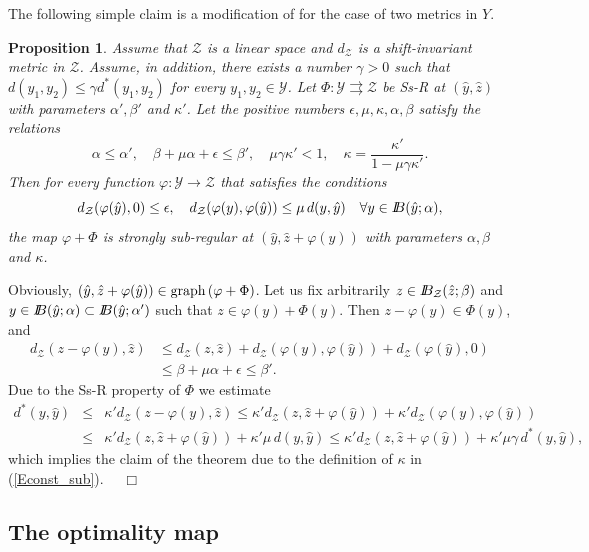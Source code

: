 \documentclass[11pt]{article}
\newtheorem{prop}[theo]{Proposition}
\newcommand{\bd}{\begin{displaymath}}
\newcommand{\ed}{\end{displaymath}}
\newcommand{\be}{\begin{equation}}
\newcommand{\ee}{\end{equation}}
\newcommand{\bda}{\begin{eqnarray*}}
\newcommand{\eda}{\end{eqnarray*}}
\newcommand{\B}{I\kern -.35em B}
\newcommand{\gr}{\mbox{\rm graph\,}}
\renewenvironment{proof}[1]{%
\par\vspace{1\baselineskip}%
\noindent{\em Proof#1.\ \ }\ignorespaces }{%
\nobreak\hfill\mbox{\ \ $\Box$}%
\par\vspace{1\baselineskip}%
}
\newcommand{\st}{\subset}
\newcommand{\al}{\alpha}
\newcommand{\ph}{\varphi}
\newcommand{\Y}{\mathcal Y}
\newcommand{\Z}{\mathcal Z}
\newcommand{\To}{\rightrightarrows }
\begin{document}
The following simple claim is a modification of \cite[Theorem 2.1]{Cibulka+Dontchev+Kruger-18} 
for the case of two metrics in $Y$.

\begin{prop} \label{P_LG}
Assume that $\Z$ is a linear space and $d_\Z$ is a shift-invariant metric in $\Z$. Assume, in addition, 
there exists a number $\gamma > 0$ such that $d(y_1,y_2) \leq \gamma d^*(y_1,y_2)$ for every $y_1, y_2 \in \Y$. 
Let $\Phi  : \Y \To \Z$ be Ss-R at $(\hat y, \hat z)$ with parameters $\alpha',\beta'$ and $\kappa'$. 
Let the positive numbers $\epsilon,\mu, \kappa, \al, \beta$ satisfy the relations
\be \label{Econst_sub}
   \al \leq \al', \quad \beta+\mu\alpha+\epsilon\le\beta',  \quad   \mu \gamma \kappa' < 1, 
           \quad  \kappa = \frac{\kappa'}{1-\mu \gamma \kappa'}.
\ee
Then for every function $\ph : \Y \to \Z$ that satisfies the conditions
\bd%
   d_{\Z}(\ph(\hat y),0)\le\epsilon, \quad d_\Z(\ph(y),\ph(\hat y)) \leq \mu \,d(y,\hat y)  \quad \forall y \in \B(\hat y; \al),
\ed%
the map $\ph + \Phi$ is strongly sub-regular at $(\hat y, \hat z + \ph(\hat y))$ with parameters $\alpha,\beta$ and $\kappa$. 
\end{prop} 

\begin{proof}{}
Obviously, $(\hat y, \hat z + \ph(\hat y)) \in \gr(\ph + \Phi)$. 
Let us fix arbitrarily $z \in \B_\Z(\hat z; \beta)$ and $y \in \B(\hat y;\al) \st \B(\hat y;\al')$ 
such that $z \in \ph(y) + \Phi(y)$.
Then $z - \ph(y) \in \Phi(y)$, and 
\begin{align*}
	d_\Z(z - \ph(y),\hat z)&\le d_\Z(z,\hat z)+d_\Z(\ph(y),\ph(\hat y))+d_\Z(\ph(\hat y),0)\\
	&\le\beta+ \mu\alpha+\epsilon\le \beta'.
\end{align*}
Due to the Ss-R property of $\Phi$ we estimate
\bda
      d^*(y,\hat y) & \leq &\kappa'  d_\Z(z - \ph(y), \hat z) 
          \leq \kappa' d_\Z(z,\hat z + \ph(\hat y))  + \kappa' d_\Z(\ph(y), \ph(\hat y)) \\
    &\leq& \kappa' d_\Z(z,\hat z + \ph(\hat y)) + \kappa' \mu \, d(y, \hat y) \leq 
            \kappa' d_\Z(z,\hat z + \ph(\hat y)) + \kappa' \mu \gamma\, d^*(y, \hat y) ,
\eda
which implies the claim of the theorem due to the definition of $\kappa$ in (\ref{Econst_sub}).
\end{proof}

\subsection{The optimality map} \label{SSOptMap}
\end{document}
